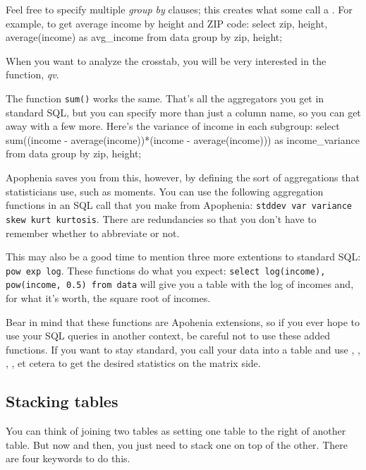 Feel free to specify multiple {\sl group by} clauses; this creates what
some call a . For example, to get average income by
height and ZIP code: 
select  zip, height, average(income) as avg_income
from data
group by zip, height;

When you want to analyze the crosstab, you will be very
interested in the  function, {\em qv}.

The function {\tt sum()} works the same. That's all the aggregators you
get in standard SQL, but you can specify more than just a column name, so you can get
away with a few more. Here's the variance of income in each subgroup:
select  sum((income - average(income))*(income - average(income))) 
               as income_variance
from data
group by zip, height;

Apophenia saves you from this, however, by defining the sort of
aggregations that statisticians use, such as moments. You can use the
following aggregation functions in an SQL call that you make from
Apophenia: {\tt stddev var variance skew kurt kurtosis}. There are
redundancies so that you don't have to remember whether to abbreviate or
not.

This may also be a good time to mention three more extentions to
standard SQL: {\tt pow exp log}. These functions do what you
expect: {\tt select log(income), pow(income, 0.5) from data} will give
you a table with the log of incomes and, for what it's worth, the square root of incomes.

Bear in mind that these functions are Apohenia extensions, so if you
ever hope to use your SQL queries in another context, be careful not to
use these added functions. If you want to stay standard,
you call your data into a table and 
use , ,
, , et cetera to get the desired
statistics on the matrix side.

\subsection{Stacking tables}
You can think of joining two tables as setting one table to the right of
another table. But now and then, you just need to stack one on top of
the other. There are four keywords to do this.

